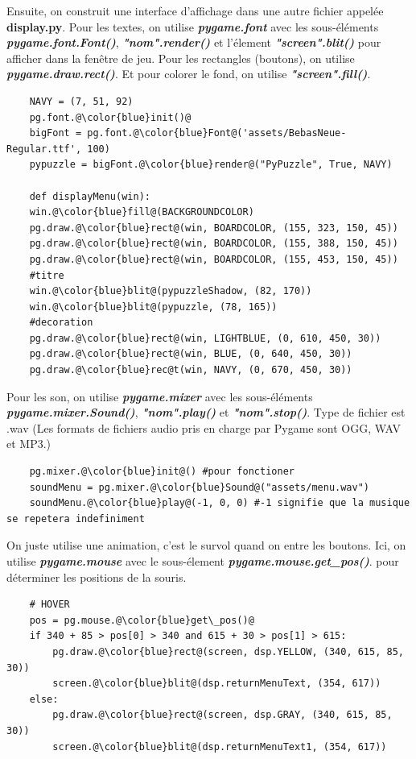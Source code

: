 \documentclass[a4paper]{report}
\begin{document}
Ensuite, on construit une interface d'affichage dans une autre fichier appelée \textbf{display.py}. 
Pour les textes, on utilise \textbf{\textit{pygame.font}} avec les sous-éléments \textbf{\textit{pygame.font.Font()}}, \textbf{\textit{"nom".render()}} et l'élement \textbf{\textit{"screen".blit()}} pour afficher dans la fenêtre de jeu. 
Pour les rectangles (boutons), on utilise \textbf{\textit{pygame.draw.rect()}}.
Et pour colorer le fond, on utilise \textbf{\textit{"screen".fill()}}.

\begin{lstlisting}
    NAVY = (7, 51, 92)
    pg.font.@\color{blue}init()@
    bigFont = pg.font.@\color{blue}Font@('assets/BebasNeue-Regular.ttf', 100)
    pypuzzle = bigFont.@\color{blue}render@("PyPuzzle", True, NAVY)

    def displayMenu(win):
    win.@\color{blue}fill@(BACKGROUNDCOLOR)
    pg.draw.@\color{blue}rect@(win, BOARDCOLOR, (155, 323, 150, 45))
    pg.draw.@\color{blue}rect@(win, BOARDCOLOR, (155, 388, 150, 45))
    pg.draw.@\color{blue}rect@(win, BOARDCOLOR, (155, 453, 150, 45))
    #titre
    win.@\color{blue}blit@(pypuzzleShadow, (82, 170))
    win.@\color{blue}blit@(pypuzzle, (78, 165))
    #decoration
    pg.draw.@\color{blue}rect@(win, LIGHTBLUE, (0, 610, 450, 30))
    pg.draw.@\color{blue}rect@(win, BLUE, (0, 640, 450, 30))
    pg.draw.@\color{blue}rec@t(win, NAVY, (0, 670, 450, 30))
\end{lstlisting}

Pour les son, on utilise \textbf{\textit{pygame.mixer}} avec les sous-éléments \textbf{\textit{pygame.mixer.Sound()}}, \textbf{\textit{"nom".play()}} et \textbf{\textit{"nom".stop()}}.
Type de fichier est .wav (Les formats de fichiers audio pris en charge par Pygame sont OGG, WAV et MP3.)
\begin{lstlisting}
    pg.mixer.@\color{blue}init@() #pour fonctioner
    soundMenu = pg.mixer.@\color{blue}Sound@("assets/menu.wav")
    soundMenu.@\color{blue}play@(-1, 0, 0) #-1 signifie que la musique se repetera indefiniment
\end{lstlisting}

On juste utilise une animation, c'est le survol quand on entre les boutons.
Ici, on utilise \textbf{\textit{pygame.mouse}} avec le sous-élement \textbf{\textit{pygame.mouse.get\_pos()}}.
pour déterminer les positions de la souris.
\begin{lstlisting}
    # HOVER
    pos = pg.mouse.@\color{blue}get\_pos()@
    if 340 + 85 > pos[0] > 340 and 615 + 30 > pos[1] > 615:
        pg.draw.@\color{blue}rect@(screen, dsp.YELLOW, (340, 615, 85, 30))
        screen.@\color{blue}blit@(dsp.returnMenuText, (354, 617))
    else:
        pg.draw.@\color{blue}rect@(screen, dsp.GRAY, (340, 615, 85, 30))
        screen.@\color{blue}blit@(dsp.returnMenuText1, (354, 617))
\end{lstlisting}
\end{document}

